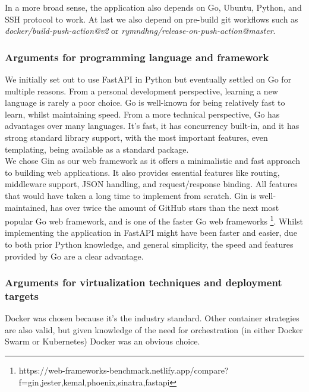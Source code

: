 In a more broad sense, the application also depends on Go, Ubuntu, Python, and SSH protocol to work. At last we 
also depend on pre-build git workflows such as \textit{docker/build-push-action@v2} or \textit{rymndhng/release-on-push-action@master}.

\subsubsection{Arguments for programming language and framework}
We initially set out to use FastAPI in Python but eventually settled on Go for multiple reasons. From a personal 
development perspective, learning a new language is rarely a poor choice. Go is well-known for being relatively 
fast to learn, whilst maintaining speed. From a more technical perspective, Go has advantages over many languages. 
It's fast, it has concurrency built-in, and it has strong standard library support, with the most important features, 
even templating, being available as a standard package. \\

We chose Gin as our web framework as it offers a minimalistic and fast approach to building web applications. 
It also provides essential features like routing, middleware support, JSON handling, and request/response binding. All features that would have taken a long time to implement from scratch. Gin is well-maintained, has over twice the 
amount of GitHub stars than the next most popular Go web framework, and is one of the faster Go web frameworks \footnote{https://web-frameworks-benchmark.netlify.app/compare?f=gin,jester,kemal,phoenix,sinatra,fastapi}.
Whilst implementing the application in FastAPI might have been faster and easier, due to both prior Python 
knowledge, and general simplicity, the speed and features provided by Go are a clear advantage.

\subsubsection{Arguments for virtualization techniques and deployment targets}
Docker was chosen because it's the industry standard. Other container strategies are also valid, but given knowledge of the need for orchestration (in either Docker Swarm or Kubernetes) Docker was an obvious choice.\\

